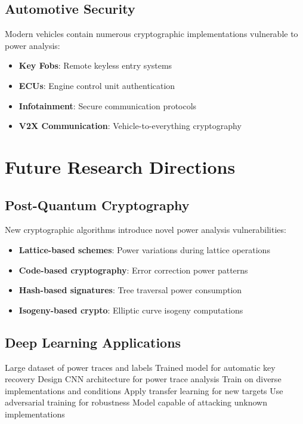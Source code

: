 \documentclass[11pt,a4paper]{article}
\theoremstyle{definition}
\begin{document}
\subsection{Automotive Security}

Modern vehicles contain numerous cryptographic implementations vulnerable to power analysis:

\begin{itemize}
    \item \textbf{Key Fobs}: Remote keyless entry systems
    \item \textbf{ECUs}: Engine control unit authentication
    \item \textbf{Infotainment}: Secure communication protocols
    \item \textbf{V2X Communication}: Vehicle-to-everything cryptography
\end{itemize}

\section{Future Research Directions}

\subsection{Post-Quantum Cryptography}

New cryptographic algorithms introduce novel power analysis vulnerabilities:

\begin{itemize}
    \item \textbf{Lattice-based schemes}: Power variations during lattice operations
    \item \textbf{Code-based cryptography}: Error correction power patterns  
    \item \textbf{Hash-based signatures}: Tree traversal power consumption
    \item \textbf{Isogeny-based crypto}: Elliptic curve isogeny computations
\end{itemize}

\subsection{Deep Learning Applications}

\begin{algorithm}
\caption{Automated Power Analysis with Deep Learning}
\begin{algorithmic}[1]
\REQUIRE Large dataset of power traces and labels
\ENSURE Trained model for automatic key recovery
\STATE Design CNN architecture for power trace analysis
\STATE Train on diverse implementations and conditions
\STATE Apply transfer learning for new targets
\STATE Use adversarial training for robustness
\RETURN Model capable of attacking unknown implementations
\end{algorithmic}
\end{algorithm}
\end{document}
